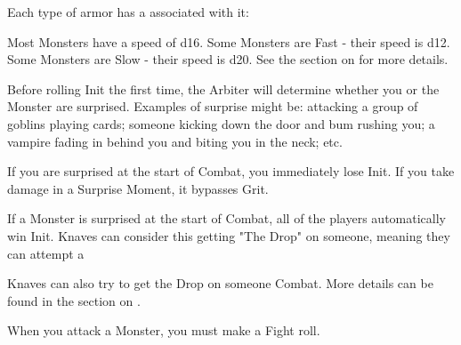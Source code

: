 {  


  Each type of armor has a \MD associated with it:



  Most Monsters have a speed of d16.  Some Monsters are Fast - their speed is d12.  Some Monsters are Slow - their speed is d20.  See the section on  for more details.



  Before rolling Init the first time, the Arbiter will determine whether you or the Monster are surprised. Examples of surprise might be: attacking a group of goblins playing cards; someone kicking down the door and bum rushing you; a vampire fading in behind you and biting you in the neck; etc.

  If you are surprised at the start of Combat, you immediately lose Init. If you take damage in a Surprise Moment, it bypasses Grit.

  If a Monster is surprised at the start of Combat, all of the players automatically win Init.  Knaves can consider this getting "The Drop" on someone, meaning they can attempt a 

  Knaves can also try to get the Drop on someone  Combat.  More details can be found in the section on . 

  



  When you attack a Monster, you must make a Fight roll.


}
